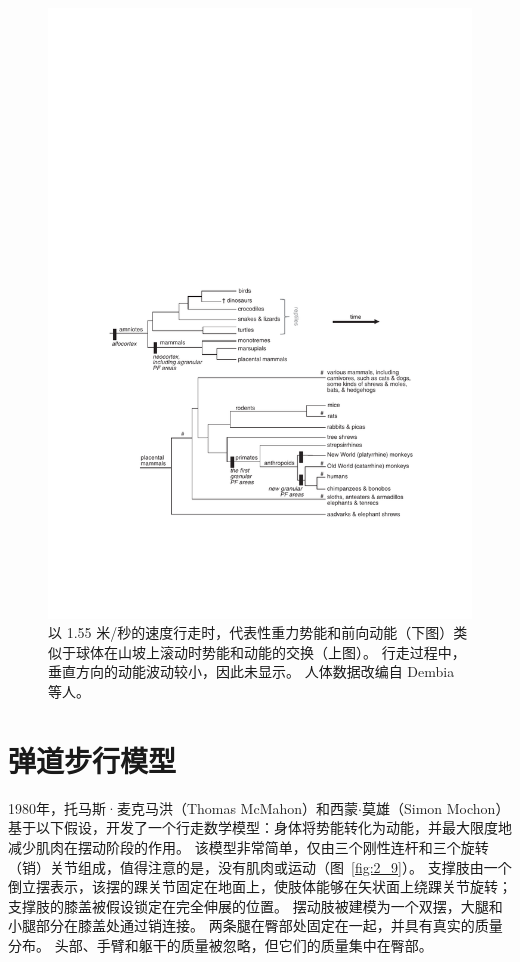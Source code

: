 \begin{figure}[!htb]
	\centering
	\includegraphics[width=0.8\linewidth]{chap2/2_8}
	\caption{以 1.55 米/秒的速度行走时，代表性重力势能和前向动能（下图）类似于球体在山坡上滚动时势能和动能的交换（上图）。
		行走过程中，垂直方向的动能波动较小，因此未显示。
		人体数据改编自 Dembia 等人\cite{dembia2017simulating}。 \label{fig:2_8}}
\end{figure}


\section{弹道步行模型}

1980年，托马斯·麦克马洪（Thomas McMahon）和西蒙$\cdot$莫雄（Simon Mochon）基于以下假设，开发了一个行走数学模型：身体将势能转化为动能，并最大限度地减少肌肉在摆动阶段的作用。
该模型非常简单，仅由三个刚性连杆和三个旋转（销）关节组成，值得注意的是，没有肌肉或运动（图~\ref{fig:2_9}）。
支撑肢由一个倒立摆表示，该摆的踝关节固定在地面上，使肢体能够在矢状面上绕踝关节旋转；
支撑肢的膝盖被假设锁定在完全伸展的位置。
摆动肢被建模为一个双摆，大腿和小腿部分在膝盖处通过销连接。
两条腿在臀部处固定在一起，并具有真实的质量分布。
头部、手臂和躯干的质量被忽略，但它们的质量集中在臀部。


